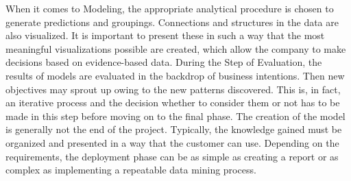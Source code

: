 When it comes to Modeling, the appropriate analytical procedure is chosen to generate predictions and groupings. Connections and structures in the data are also visualized. 
It is important to present these in such a way that the most meaningful visualizations possible are created, which allow the company to make decisions based on evidence-based data.
During the Step of Evaluation, the results of models are evaluated in the backdrop of business intentions. 
Then new objectives may sprout up owing to the new patterns discovered. This is, in fact, an iterative process and the decision whether to consider them or not has 
to be made in this step before moving on to the final phase. \cite[p. 530]{Schroer2021}
The creation of the model is generally not the end of the project. Typically, the knowledge gained must be organized and presented in a way that the customer can use. 
Depending on the requirements, the deployment phase can be as simple as creating a report or as complex as implementing a repeatable data mining process. \cite[p. 532]{Schroer2021}